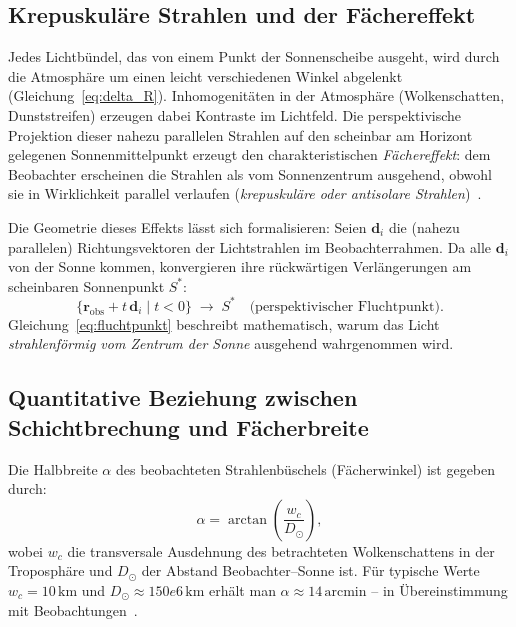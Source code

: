 \documentclass[12pt,a4paper]{article}
\providecommand{\SI}[2]{\ensuremath{#1\,#2}}
\providecommand{\ang}[1]{\ensuremath{#1\,\mathrm{arcmin}}}
\providecommand{\kilo}{\mathrm{k}}
\providecommand{\metre}{\mathrm{m}}
\begin{document}
\subsection{Krepuskuläre Strahlen und der Fächereffekt}

Jedes Lichtbündel, das von einem Punkt der Sonnenscheibe ausgeht,
wird durch die Atmosphäre um einen leicht verschiedenen Winkel
abgelenkt (Gleichung~\ref{eq:delta_R}).
Inhomogenitäten in der Atmosphäre (Wolkenschatten, Dunststreifen)
erzeugen dabei Kontraste im Lichtfeld.
Die perspektivische Projektion dieser nahezu parallelen Strahlen
auf den scheinbar am Horizont gelegenen Sonnenmittelpunkt erzeugt
den charakteristischen \emph{Fächereffekt}: 
dem Beobachter erscheinen die Strahlen als vom Sonnenzentrum ausgehend,
obwohl sie in Wirklichkeit parallel verlaufen
(\emph{krepuskuläre oder antisolare Strahlen})~\citep{MinnaertNaturalOptics}.

Die Geometrie dieses Effekts lässt sich formalisieren:
Seien $\mathbf{d}_i$ die (nahezu parallelen) Richtungsvektoren der
Lichtstrahlen im Beobachterrahmen.
Da alle $\mathbf{d}_i$ von der Sonne kommen, konvergieren ihre rückwärtigen
Verlängerungen am scheinbaren Sonnenpunkt $S^*$:
\begin{equation}
  \{\mathbf{r}_{\text{obs}} + t\,\mathbf{d}_i\;\big|\; t < 0\}
  \;\longrightarrow\; S^*
  \quad \text{(perspektivischer Fluchtpunkt).}
  \label{eq:fluchtpunkt}
\end{equation}
Gleichung~\eqref{eq:fluchtpunkt} beschreibt mathematisch,
warum das Licht \emph{strahlenförmig vom Zentrum der Sonne}
ausgehend wahrgenommen wird.

\subsection{Quantitative Beziehung zwischen Schichtbrechung und Fächerbreite}

Die Halbbreite $\alpha$ des beobachteten Strahlenbüschels
(Fächerwinkel) ist gegeben durch:
\begin{equation}
  \alpha = \arctan\!\left(
    \frac{w_c}{D_\odot}
  \right),
  \label{eq:facher_winkel}
\end{equation}
wobei $w_c$ die transversale Ausdehnung des betrachteten
Wolkenschattens in der Troposphäre und $D_\odot$ der
Abstand Beobachter--Sonne ist.
Für typische Werte $w_c = \SI{10}{\kilo\metre}$ und
$D_\odot \approx \SI{150e6}{\kilo\metre}$ erhält man
$\alpha \approx \ang{14}$ -- in Übereinstimmung mit
Beobachtungen~\citep{Greenler1980}.
\end{document}
